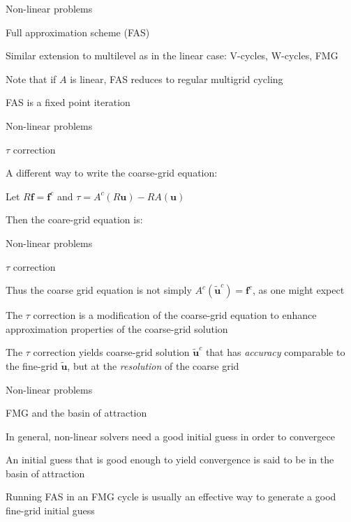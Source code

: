 \documentclass[18pt,xcolor=table]{beamer}
\begin{document}
\begin{frame}{Non-linear problems}
\begin{block}{Full approximation scheme (FAS)}
\bit
\item Similar extension to multilevel as in the linear case: V-cycles, W-cycles, FMG
\item Note that if $A$ is linear, FAS reduces to regular multigrid cycling
\item FAS is a fixed point iteration 
\eit
\end{block}
\end{frame}

\begin{frame}{Non-linear problems}
\begin{block}{$\tau$ correction}
\bit
\item A different way to write the coarse-grid equation:
\item Let $R\mathbf{f} = \mathbf{f}^c$ and $\tau = A^c(R\mathbf{u}) - RA(\mathbf{u})$
\item Then the coare-grid equation is:
\eit
\end{block}
\end{frame}

\begin{frame}{Non-linear problems}
\begin{block}{$\tau$ correction}
\bit
\item Thus the coarse grid equation is not simply $A^c(\mathbf{\tilde{u}}^c) = \mathbf{f}^c$, as one might expect
\item The $\tau$ correction is a modification of the coarse-grid equation to enhance approximation properties of the coarse-grid solution
\item The $\tau$ correction yields coarse-grid solution $\mathbf{\tilde{u}}^c$ that has \emph{accuracy} comparable to the fine-grid $\mathbf{\tilde{u}}$, but at the \emph{resolution} of the coarse grid
\eit
\end{block}
\end{frame}

\begin{frame}{Non-linear problems}
\begin{block}{FMG and the basin of attraction}
\bit
\item In general, non-linear solvers need a good initial guess in order to convergece
\item An initial guess that is good enough to yield convergence is said to be in the basin of attraction
\item Running FAS in an FMG cycle is usually an effective way to generate a good fine-grid initial guess
\eit
\end{block}
\end{frame}
\end{document}
